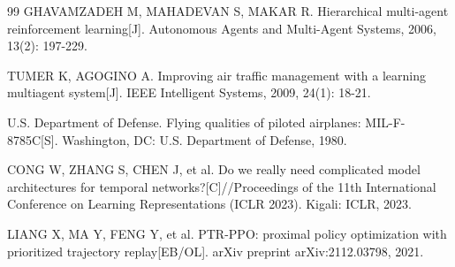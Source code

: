 \documentclass[12pt,a4paper,UTF8]{ctexart}
\begin{document}
\begin{thebibliography}{99}
 GHAVAMZADEH M, MAHADEVAN S, MAKAR R. Hierarchical multi-agent reinforcement learning[J]. Autonomous Agents and Multi-Agent Systems, 2006, 13(2): 197-229.

 TUMER K, AGOGINO A. Improving air traffic management with a learning multiagent system[J]. IEEE Intelligent Systems, 2009, 24(1): 18-21.

 U.S. Department of Defense. Flying qualities of piloted airplanes: MIL-F-8785C[S]. Washington, DC: U.S. Department of Defense, 1980.

 CONG W, ZHANG S, CHEN J, et al. Do we really need complicated model architectures for temporal networks?[C]//Proceedings of the 11th International Conference on Learning Representations (ICLR 2023). Kigali: ICLR, 2023.

 LIANG X, MA Y, FENG Y, et al. PTR-PPO: proximal policy optimization with prioritized trajectory replay[EB/OL]. arXiv preprint arXiv:2112.03798, 2021.

\end{thebibliography}
\end{document}
